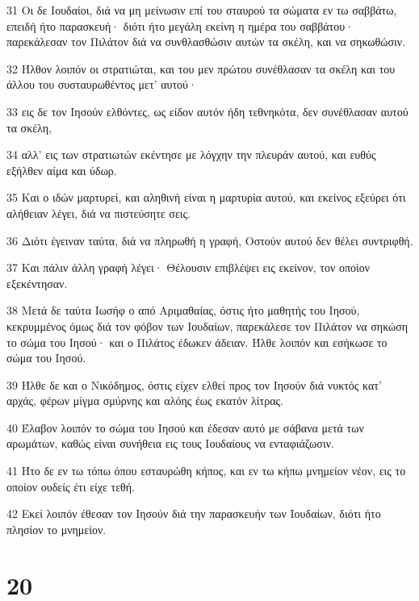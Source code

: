 \par 31 Οι δε Ιουδαίοι, διά να μη μείνωσιν επί του σταυρού τα σώματα εν τω σαββάτω, επειδή ήτο παρασκευή· διότι ήτο μεγάλη εκείνη η ημέρα του σαββάτου· παρεκάλεσαν τον Πιλάτον διά να συνθλασθώσιν αυτών τα σκέλη, και να σηκωθώσιν.
\par 32 Ήλθον λοιπόν οι στρατιώται, και του μεν πρώτου συνέθλασαν τα σκέλη και του άλλου του συσταυρωθέντος μετ' αυτού·
\par 33 εις δε τον Ιησούν ελθόντες, ως είδον αυτόν ήδη τεθνηκότα, δεν συνέθλασαν αυτού τα σκέλη,
\par 34 αλλ' εις των στρατιωτών εκέντησε με λόγχην την πλευράν αυτού, και ευθύς εξήλθεν αίμα και ύδωρ.
\par 35 Και ο ιδών μαρτυρεί, και αληθινή είναι η μαρτυρία αυτού, και εκείνος εξεύρει ότι αλήθειαν λέγει, διά να πιστεύσητε σεις.
\par 36 Διότι έγειναν ταύτα, διά να πληρωθή η γραφή, Οστούν αυτού δεν θέλει συντριφθή.
\par 37 Και πάλιν άλλη γραφή λέγει· Θέλουσιν επιβλέψει εις εκείνον, τον οποίον εξεκέντησαν.
\par 38 Μετά δε ταύτα Ιωσήφ ο από Αριμαθαίας, όστις ήτο μαθητής του Ιησού, κεκρυμμένος όμως διά τον φόβον των Ιουδαίων, παρεκάλεσε τον Πιλάτον να σηκώση το σώμα του Ιησού· και ο Πιλάτος έδωκεν άδειαν. Ήλθε λοιπόν και εσήκωσε το σώμα του Ιησού.
\par 39 Ήλθε δε και ο Νικόδημος, όστις είχεν ελθεί προς τον Ιησούν διά νυκτός κατ' αρχάς, φέρων μίγμα σμύρνης και αλόης έως εκατόν λίτρας.
\par 40 Έλαβον λοιπόν το σώμα του Ιησού και έδεσαν αυτό με σάβανα μετά των αρωμάτων, καθώς είναι συνήθεια εις τους Ιουδαίους να ενταφιάζωσιν.
\par 41 Ήτο δε εν τω τόπω όπου εσταυρώθη κήπος, και εν τω κήπω μνημείον νέον, εις το οποίον ουδείς έτι είχε τεθή.
\par 42 Εκεί λοιπόν έθεσαν τον Ιησούν διά την παρασκευήν των Ιουδαίων, διότι ήτο πλησίον το μνημείον.

\chapter{20}

